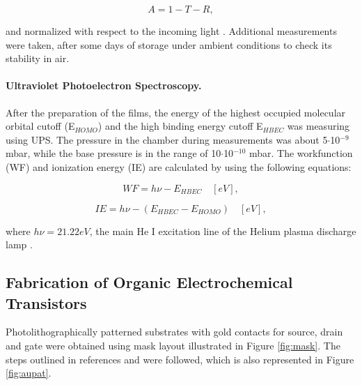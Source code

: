 \begin{equation}\label{eq:abs}
	A = 1 - T - R,
\end{equation}

and normalized with respect to the incoming light \cite{uvvis}. Additional measurements were taken, after some days of storage under ambient conditions to check its stability in air.

\paragraph{Ultraviolet Photoelectron Spectroscopy.}After the preparation of the films, %
the energy of the highest occupied molecular orbital cutoff (E$_{HOMO}$) and the high binding energy cutoff E$_{HBEC}$ was measuring using UPS. The pressure in the chamber during measurements was about 5$\cdot$10$^{-9}$ mbar, while the base pressure is in the range of 10$\cdot$10$^{-10}$ mbar. The workfunction (WF) and ionization energy (IE) are calculated by using the following equations:

\begin{equation}\label{eq:wf}
	WF = h\nu - E_{HBEC} \quad [eV],
\end{equation}

\begin{equation}\label{eq:ie}
	IE = h\nu - (E_{HBEC}-E_{HOMO}) \quad [eV],
\end{equation}

where $h\nu = 21.22 eV$, the main He I excitation line of the Helium plasma discharge lamp \cite{buchholtzDopingPropertiesNovel2021}. 
 

\subsection{Fabrication of Organic Electrochemical Transistors}

Photolithographically patterned substrates with gold contacts for source, drain and gate were obtained using mask layout illustrated in Figure \ref{fig:mask}. The steps outlined in references \cite{weissbachPhotopatternableSolidElectrolyte2022} and \cite{bongartzOrganicElectrochemicalTransistors2021} were followed, which is also represented in Figure \ref{fig:aupat}.

